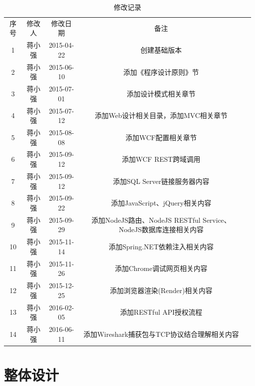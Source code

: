 \documentclass{book}
\begin{document}
\begin{table}\caption[Caption for LOF]{修改记录\protect\footnotemark}					
	\medskip
	\centering		
	\begin{tabular}{|c|c|c|c|c|}
		\hline
		\multirow{1}{*}{序号}
		& \multicolumn{1}{c|}{修改人}  
		& \multicolumn{1}{c|}{修改日期} 
		& \multicolumn{1}{c|}{备注}\\			
		\cline{1-4}
		1 & 蒋小强 & 2015-04-22 & 创建基础版本\\
		\hline
		2 & 蒋小强 & 2015-06-10 & 添加《程序设计原则》节 \\
		\hline
		3 & 蒋小强 & 2015-07-01 & 添加设计模式相关章节\\
		\hline
		4 & 蒋小强 & 2015-07-12 & 添加Web设计相关目录，添加MVC相关章节 \\
		\hline
		5 & 蒋小强 & 2015-08-08 & 添加WCF配置相关章节\\
		\hline
		6 & 蒋小强 & 2015-09-12 & 添加WCF REST跨域调用\\
		\hline
		7 & 蒋小强 & 2015-09-12 & 添加SQL Server链接服务器内容\\
		\hline
		8 & 蒋小强 & 2015-09-22 & 添加JavaScript、jQuery相关内容\\
		\hline
		9 & 蒋小强 & 2015-09-29 & 添加NodeJS路由、NodeJS RESTful Service、NodeJS数据库连接相关内容\\
		\hline
		10 & 蒋小强 & 2015-11-14 & 添加Spring.NET依赖注入相关内容\\
		\hline
		11 & 蒋小强 & 2015-11-26 & 添加Chrome调试网页相关内容\\
		\hline
		12 & 蒋小强 & 2015-12-25 & 添加浏览器渲染(Render)相关内容\\
		\hline
		13 & 蒋小强 & 2016-02-05 & 添加RESTful API授权流程\\
		\hline
		14 & 蒋小强 & 2016-06-11 & 添加Wireshark捕获包与TCP协议结合理解相关内容\\
		\hline
	\end{tabular}
\end{table}


\clearpage

\clearpage
\mbox{}         
\clearpage
	
\tableofcontents	

\part{整体设计}
\end{document}
